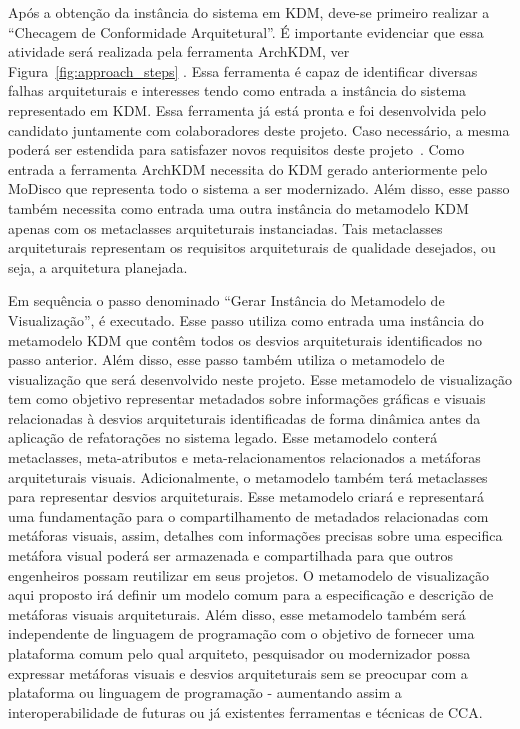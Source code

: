 \documentclass[12pt]{article}
\begin{document}
Após a obtenção da instância do sistema em KDM, deve-se primeiro realizar a ``Checagem de Conformidade Arquitetural''. É importante evidenciar que essa atividade será realizada pela ferramenta ArchKDM, ver Figura~\ref{fig:approach_steps} . Essa ferramenta é capaz de identificar diversas falhas arquiteturais e interesses tendo como entrada a instância do sistema representado em KDM. Essa ferramenta já está pronta e foi desenvolvida pelo candidato juntamente com colaboradores deste projeto. Caso necessário, a mesma poderá ser estendida para satisfazer novos requisitos deste projeto~\cite{source_miner_glauco, daniel_san_journal}. Como entrada a ferramenta ArchKDM necessita do KDM gerado anteriormente pelo MoDisco que representa todo o sistema a ser modernizado. Além disso, esse passo também necessita como entrada uma outra instância do metamodelo KDM apenas com os metaclasses arquiteturais instanciadas. Tais metaclasses arquiteturais representam os requisitos arquiteturais de qualidade desejados, ou seja, a arquitetura planejada.  

Em sequência o passo denominado ``Gerar Instância do Metamodelo de Visualização'', é executado. Esse passo utiliza como entrada uma instância do metamodelo KDM que contêm todos os desvios arquiteturais identificados no passo anterior. Além disso, esse passo também utiliza o metamodelo de visualização que será desenvolvido neste projeto. Esse metamodelo de visualização tem como objetivo representar metadados sobre informações gráficas e visuais relacionadas à desvios arquiteturais identificadas de forma dinâmica antes da aplicação de refatorações no sistema legado. Esse metamodelo conterá metaclasses, meta-atributos e meta-relacionamentos relacionados a metáforas arquiteturais visuais. Adicionalmente, o metamodelo também terá metaclasses para representar desvios arquiteturais. Esse metamodelo criará e representará uma fundamentação para o compartilhamento de metadados relacionadas com metáforas visuais, assim, detalhes com informações precisas sobre uma especifica metáfora visual poderá ser armazenada e compartilhada para que outros engenheiros possam reutilizar em seus projetos. O metamodelo de visualização aqui proposto irá definir um modelo comum para a especificação e descrição de metáforas visuais arquiteturais. Além disso, esse metamodelo também será independente de linguagem de programação com o objetivo de fornecer uma plataforma comum pelo qual arquiteto, pesquisador ou modernizador possa expressar metáforas visuais e desvios arquiteturais sem se preocupar com a plataforma ou linguagem de programação - aumentando assim a interoperabilidade de futuras ou já existentes ferramentas e técnicas de CCA.
\end{document}
